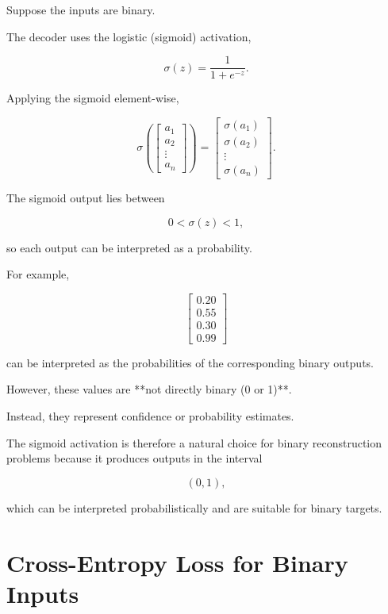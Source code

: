 \documentclass{article}
\begin{document}
	Suppose the inputs are binary.
	
	The decoder uses the logistic (sigmoid) activation,
	
	\[
	\sigma(z)
	=
	\frac{1}{1+e^{-z}}.
	\]
	
	Applying the sigmoid element-wise,
	
	\[
	\sigma
	\left(
	\begin{bmatrix}
		a_1\\
		a_2\\
		\vdots\\
		a_n
	\end{bmatrix}
	\right)
	=
	\begin{bmatrix}
		\sigma(a_1)\\
		\sigma(a_2)\\
		\vdots\\
		\sigma(a_n)
	\end{bmatrix}.
	\]
	
	The sigmoid output lies between
	
	\[
	0
	<
	\sigma(z)
	<
	1,
	\]
	
	so each output can be interpreted as a probability.
	
	For example,
	
	\[
	\begin{bmatrix}
		0.20\\
		0.55\\
		0.30\\
		0.99
	\end{bmatrix}
	\]
	
	can be interpreted as the probabilities of the corresponding binary outputs.
	
	However, these values are **not directly binary (0 or 1)**.
	
	Instead, they represent confidence or probability estimates.
	
	
	The sigmoid activation is therefore a natural choice for binary reconstruction problems because it produces outputs in the interval
	
	\[
	(0,1),
	\]
	
	which can be interpreted probabilistically and are suitable for binary targets.
	
	\section{Cross-Entropy Loss for Binary Inputs}
	
\end{document}
